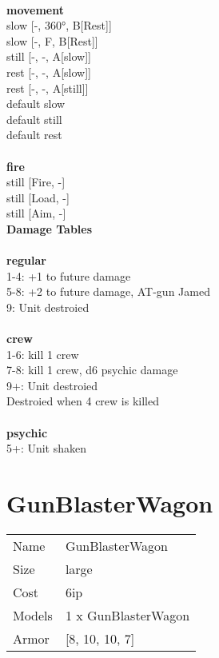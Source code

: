 \ \\ {\bf movement } \\
slow [-, 360°, B[Rest]] \\
slow [-, F, B[Rest]] \\
still [-, -, A[slow]] \\
rest [-, -, A[slow]] \\
rest [-, -, A[still]] \\
default slow \\
default still \\
default rest \\
\ \\ {\bf fire } \\
still [Fire, -] \\
still [Load, -] \\
still [Aim, -] \\


{\bf Damage Tables} \\
\ \\ {\bf regular } \\
1-4: +1 to future damage \\
5-8: +2 to future damage, AT-gun Jamed \\
9: Unit destroied \\
\ \\ {\bf crew } \\
1-6: kill 1 crew \\
7-8: kill 1 crew, d6 psychic damage \\
9+: Unit destroied \\
Destroied when 4 crew is killed \\
\ \\ {\bf psychic } \\
5+: Unit shaken \\










\pagebreak\pagebreak

\section{ GunBlasterWagon }

\begin{tabular}{ll}
  Name & GunBlasterWagon \\
  Size & large\\
  Cost & 6ip\\
  Models & 1 x GunBlasterWagon\\
  Armor & [8, 10, 10, 7]\\
\end{tabular}

